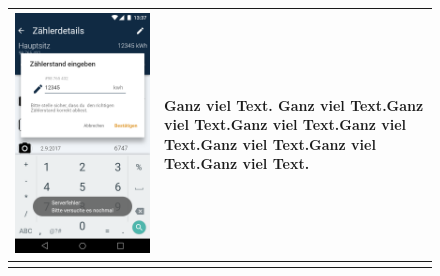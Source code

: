 \begin{figure}[h]
\begin{tabularx}{\textwidth}{X | X}
	\includegraphics[scale = 0.22]{img/AndroidMockup/serverException} & Ganz viel Text. Ganz viel Text.Ganz viel Text.Ganz viel Text.Ganz viel Text.Ganz viel Text.Ganz viel Text.Ganz viel Text. \\ \hline \\

\end{tabularx}
\end{figure}
